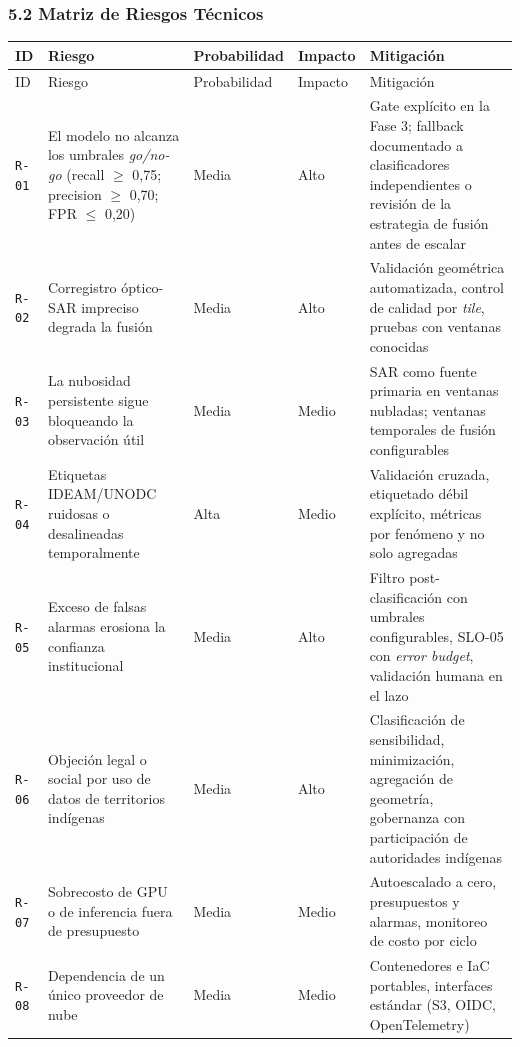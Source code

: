 \documentclass{article}
\begin{document}
\subsubsection{5.2 Matriz de Riesgos Técnicos}

{\footnotesize
\begin{longtable}{@{}L{0.40in}L{1.65in}L{0.80in}L{0.47in}L{2.49in}@{}}
\toprule
ID & Riesgo & Probabilidad & Impacto & Mitigación \\
\midrule
\endfirsthead
\toprule
ID & Riesgo & Probabilidad & Impacto & Mitigación \\
\midrule
\endhead
\bottomrule
\endlastfoot
\texttt{R-\allowbreak{}01} & El modelo no alcanza los umbrales \emph{go/no-go} (recall \ensuremath{\geq} 0,75; precision \ensuremath{\geq} 0,70; FPR \ensuremath{\leq} 0,20) & Media & Alto & Gate explícito en la Fase 3; fallback documentado a clasificadores independientes o revisión de la estrategia de fusión antes de escalar \\
\texttt{R-\allowbreak{}02} & Corregistro óptico-SAR impreciso degrada la fusión & Media & Alto & Validación geométrica automatizada, control de calidad por \emph{tile}, pruebas con ventanas conocidas \\
\texttt{R-\allowbreak{}03} & La nubosidad persistente sigue bloqueando la observación útil & Media & Medio & SAR como fuente primaria en ventanas nubladas; ventanas temporales de fusión configurables \\
\texttt{R-\allowbreak{}04} & Etiquetas IDEAM/UNODC ruidosas o desalineadas temporalmente & Alta & Medio & Validación cruzada, etiquetado débil explícito, métricas por fenómeno y no solo agregadas \\
\texttt{R-\allowbreak{}05} & Exceso de falsas alarmas erosiona la confianza institucional & Media & Alto & Filtro post-clasificación con umbrales configurables, SLO-05 con \emph{error budget}, validación humana en el lazo \\
\texttt{R-\allowbreak{}06} & Objeción legal o social por uso de datos de territorios indígenas & Media & Alto & Clasificación de sensibilidad, minimización, agregación de geometría, gobernanza con participación de autoridades indígenas \\
\texttt{R-\allowbreak{}07} & Sobrecosto de GPU o de inferencia fuera de presupuesto & Media & Medio & Autoescalado a cero, presupuestos y alarmas, monitoreo de costo por ciclo \\
\texttt{R-\allowbreak{}08} & Dependencia de un único proveedor de nube & Media & Medio & Contenedores e IaC portables, interfaces estándar (S3, OIDC, OpenTelemetry) \\

\end{longtable}}
\end{document}
